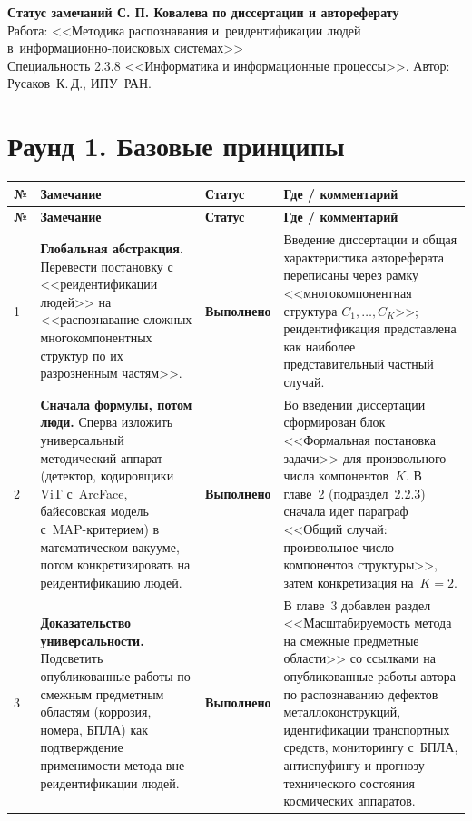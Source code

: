 \documentclass[a4paper,11pt]{article}
\newcommand{\statusDone}{{\color{statusDone}\textbf{Выполнено}}}
\begin{document}
\begin{center}
{\Large\bfseries Статус замечаний С. П. Ковалева по диссертации и автореферату}\\[6pt]
{\large Работа: <<Методика распознавания и~реидентификации людей в~информационно-поисковых системах>>}\\[2pt]
Специальность 2.3.8 <<Информатика и информационные процессы>>. Автор: Русаков~К.\,Д., ИПУ~РАН.
\end{center}

\vspace{6pt}

\section*{Раунд 1. Базовые принципы}

\begin{longtable}{@{}p{}p{}p{}p{}@{}}
\toprule
\textbf{№} & \textbf{Замечание} & \textbf{Статус} & \textbf{Где / комментарий}\\
\midrule
\endfirsthead
\toprule
\textbf{№} & \textbf{Замечание} & \textbf{Статус} & \textbf{Где / комментарий}\\
\midrule
\endhead
\bottomrule
\endfoot

1 & \textbf{Глобальная абстракция.} Перевести постановку с <<реидентификации людей>> на <<распознавание сложных многокомпонентных структур по их разрозненным частям>>.
& \statusDone
& Введение диссертации и общая характеристика автореферата переписаны через рамку <<многокомпонентная структура $C_1,\ldots,C_K$>>; реидентификация представлена как наиболее представительный частный случай.\\
\midrule

2 & \textbf{Сначала формулы, потом люди.} Сперва изложить универсальный методический аппарат (детектор, кодировщики ViT с~ArcFace, байесовская модель с~MAP-критерием) в математическом вакууме, потом конкретизировать на реидентификацию людей.
& \statusDone
& Во введении диссертации сформирован блок <<Формальная постановка задачи>> для произвольного числа компонентов~$K$. В главе~2 (подраздел~2.2.3) сначала идет параграф <<Общий случай: произвольное число компонентов структуры>>, затем конкретизация на~$K=2$.\\
\midrule

3 & \textbf{Доказательство универсальности.} Подсветить опубликованные работы по смежным предметным областям (коррозия, номера, БПЛА) как подтверждение применимости метода вне реидентификации людей.
& \statusDone
& В главе~3 добавлен раздел <<Масштабируемость метода на смежные предметные области>> со ссылками на опубликованные работы автора по распознаванию дефектов металлоконструкций, идентификации транспортных средств, мониторингу с~БПЛА, антиспуфингу и прогнозу технического состояния космических аппаратов.\\
\end{longtable}
\end{document}
